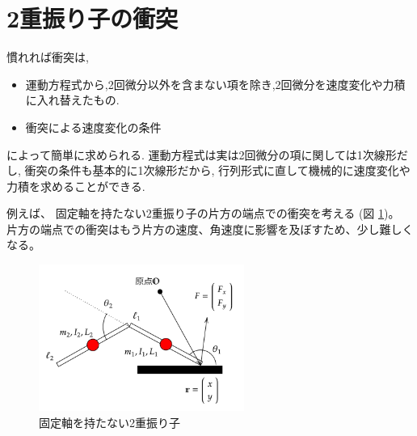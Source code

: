 \documentclass[a4paper,11pt]{jsarticle}
\begin{document}
\clearpage
\section{2重振り子の衝突}

慣れれば衝突は,
\begin{itemize}
  \item 運動方程式から,2回微分以外を含まない項を除き,2回微分を速度変化や力積に入れ替えたもの.
  \item 衝突による速度変化の条件
\end{itemize}
によって簡単に求められる.
運動方程式は実は2回微分の項に関しては1次線形だし,
衝突の条件も基本的に1次線形だから,
行列形式に直して機械的に速度変化や力積を求めることができる.

例えば、
固定軸を持たない2重振り子の片方の端点での衝突を考える
(図 \ref{2seg_collision.png})。
片方の端点での衝突はもう片方の速度、角速度に影響を及ぼすため、少し難しくなる。

\begin{figure}[h]
  \centering
  \includegraphics[width = 0.6\textwidth]{2seg_collision.png}
  \caption{固定軸を持たない2重振り子}
  \label{2seg_collision.png}
\end{figure}
\end{document}
